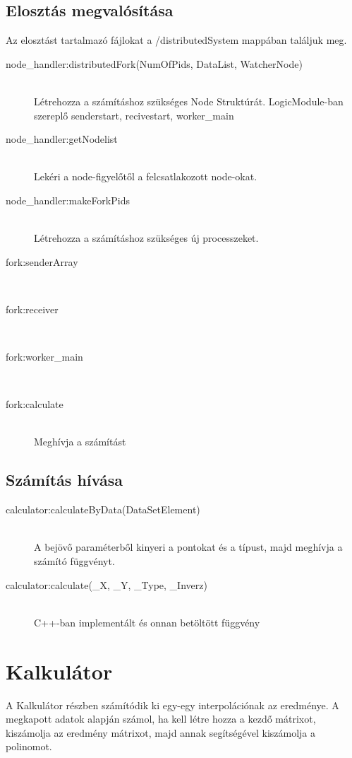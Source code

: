 \subsection{Elosztás megvalósítása}
	Az elosztást tartalmazó fájlokat a /distributedSystem mappában találjuk meg. 
	\begin{description}
		\item[node\_handler:distributedFork(NumOfPids, DataList, WatcherNode)]
		\hfill \\
		Létrehozza a számításhoz szükséges Node Struktúrát.
		LogicModule-ban szereplő senderstart, recivestart, worker\_main 
		\item[node\_handler:getNodelist]
		\hfill \\
		Lekéri a node-figyelőtől a felcsatlakozott node-okat.
		\item[node\_handler:makeForkPids]
		\hfill \\
		Létrehozza a számításhoz szükséges új processzeket.

		\item[fork:senderArray]
		\hfill \\ 

		\item[fork:receiver]
		\hfill \\
		\item[fork:worker\_main]
		\hfill \\
		\item[fork:calculate]
		\hfill \\ Meghívja a számítást
	\end{description}
\subsection{Számítás hívása}
	\begin{description}
	\item[calculator:calculateByData(DataSetElement)]
	\hfill \\ 
	A bejövő paraméterből kinyeri a pontokat és a típust, majd meghívja a számító függvényt.
	\item[calculator:calculate(\_X, \_Y, \_Type, \_Inverz)]
	\hfill \\ C++-ban implementált és onnan betöltött függvény
	\end{description}

\section{Kalkulátor}
A Kalkulátor részben számítódik ki egy-egy interpolációnak az eredménye.
A megkapott adatok alapján számol, ha kell létre hozza a kezdő mátrixot, kiszámolja az eredmény mátrixot, majd annak segítségével kiszámolja a polinomot. \newline


